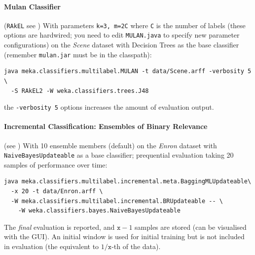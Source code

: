 \documentclass[11pt]{article}
\begin{document}
\paragraph{Mulan Classifier} (\texttt{RAkEL} see \cite{RAKEL}) With parameters \texttt{\texttt{k=3}, \texttt{m=2C}} where \texttt{C} is the number of labels (these options are hardwired; you need to edit \texttt{MULAN.java} to specify new parameter configurations) on the \textit{Scene} dataset with Decision Trees as the base classifier (remember {\texttt{mulan.jar} must be in the classpath}):
\begin{lstlisting}
java meka.classifiers.multilabel.MULAN -t data/Scene.arff -verbosity 5 \ 
  -S RAkEL2 -W weka.classifiers.trees.J48
\end{lstlisting}
the \texttt{-verbosity 5} options increases the amount of evaluation output.



\paragraph{Incremental Classification: Ensembles of Binary Relevance} (see \cite{ECC2,MEDS2}) With 10 ensemble members (default) on the \textit{Enron} dataset with \texttt{NaiveBayesUpdateable} as a base classifier; prequential evaluation taking 20 samples of performance over time:

\begin{lstlisting}
java meka.classifiers.multilabel.incremental.meta.BaggingMLUpdateable\
  -x 20 -t data/Enron.arff \
  -W meka.classifiers.multilabel.incremental.BRUpdateable -- \
    -W weka.classifiers.bayes.NaiveBayesUpdateable
\end{lstlisting}

The \emph{final} evaluation is reported, and $\texttt{x}-1$ samples are stored (can be visualised with the GUI). An initial window is used for initial training but is not included in evaluation (the equivalent to $1/\texttt{x}$-th of the data). 
\end{document}
